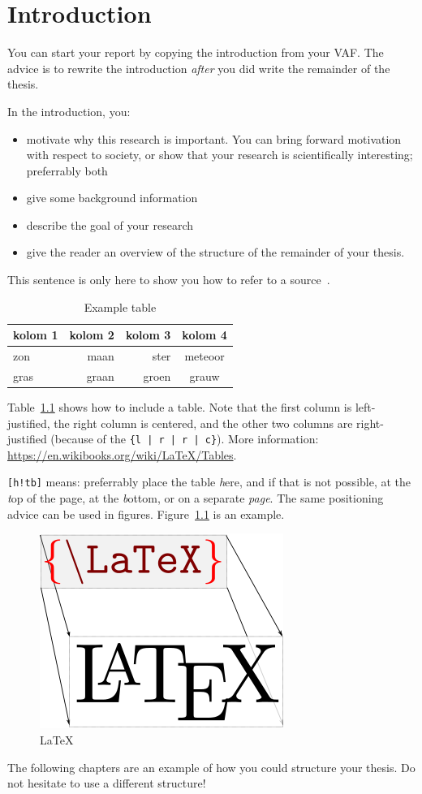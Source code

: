\chapter{Introduction}
You can start your report by copying the introduction from your VAF. The advice is to rewrite the introduction \emph{after} you did write the remainder of the thesis.

In the introduction, you:

\begin{itemize}
	\item motivate why this research is important. You can bring forward motivation with respect to society, or show that your research is scientifically interesting; preferrably both
	\item give some background information
	\item describe the goal of your research
	\item give the reader an overview of the structure of the remainder of your thesis.
\end{itemize}

This sentence is only here to show you how to refer to a source~\citep{Dijkstra-1968}.

\begin{table}[h!tbp]
\begin{tabular}{l | r | r| c}
kolom 1 & kolom 2 & kolom 3 & kolom 4 \\
\hline
zon & maan & ster & meteoor\\
gras & graan & groen & grauw\\
\end{tabular}
\caption{Example table}
\label{table-example}
\end{table}

Table~\ref{table-example} shows how to include a table. Note that the first column is left-justified, the right column is centered, and the other two columns are right-justified (because of the \texttt{\{l | r | r | c\}}). More information: \url{https://en.wikibooks.org/wiki/LaTeX/Tables}. 

\texttt{[h!tb]} means: preferrably place the table \emph{h}ere, and if that is not possible, at the \emph{t}op of the page, at the \emph{b}ottom, or on a separate \emph{page}. The same positioning advice can be used in figures. Figure~\ref{fig-example} is an example.

\begin{figure}[h!tbp]
\includegraphics[scale=0.5]{LaTeX.png}
\caption{LaTeX}
\label{fig-example}
\end{figure}

The following chapters are an example of how you could structure your thesis. Do not hesitate to use a different structure!